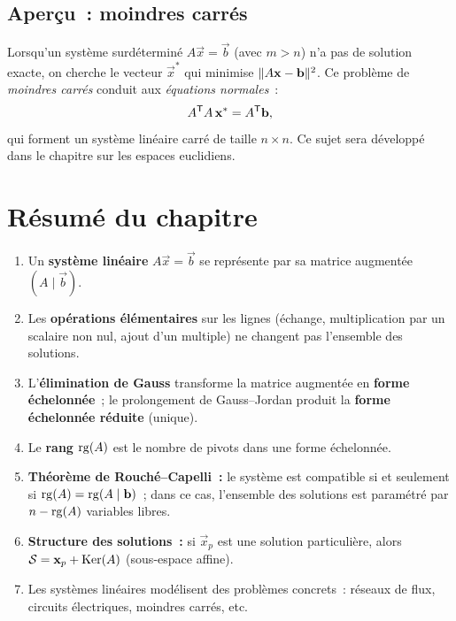 \subsection{Aperçu~: moindres carrés}\label{subsec:moindres-carres}

Lorsqu'un système surdéterminé $A\vec{x}=\vec{b}$ (avec $m>n$) n'a pas de
solution exacte, on cherche le vecteur $\vec{x}^{*}$ qui minimise
$\lVert A\mathbf{x}-\mathbf{b}\rVert^2$. Ce problème de \emph{moindres carrés}%
 conduit aux \emph{équations normales}~:
\begin{equation}\label{eq:equations-normales}
  {A}^{\mathsf{T}}A\,\mathbf{x}^{*}={A}^{\mathsf{T}}\mathbf{b},
\end{equation}
qui forment un système linéaire carré de taille $n\times n$. Ce sujet sera
développé dans le chapitre sur les espaces euclidiens.

\section*{Résumé du chapitre}

\begin{enumerate}[label=\textbf{\arabic*.}]
  \item Un \textbf{système linéaire} $A\vec{x}=\vec{b}$
    se représente par sa matrice augmentée $(A\mid\vec{b})$.
  \item Les \textbf{opérations élémentaires} sur les lignes (échange,
    multiplication par un scalaire non nul, ajout d'un multiple) ne
    changent pas l'ensemble des solutions.
  \item L'\textbf{élimination de Gauss} transforme la matrice augmentée en
    \textbf{forme échelonnée}~; le prolongement de Gauss--Jordan produit la
    \textbf{forme échelonnée réduite} (unique).
  \item Le \textbf{rang} $\operatorname{rg}(A)$ est le nombre de pivots dans une forme
    échelonnée.
  \item \textbf{Théorème de Rouché--Capelli~:} le système est compatible si
    et seulement si $\operatorname{rg}(A)=\operatorname{rg}(A\mid\mathbf{b})$~; dans ce cas, l'ensemble
    des solutions est paramétré par $n-\operatorname{rg}(A)$ variables libres.
  \item \textbf{Structure des solutions~:} si $\vec{x}_p$ est une solution
    particulière, alors ${\mathcal{S}}=\mathbf{x}_p+\operatorname{Ker}(A)$ (sous-espace affine).
  \item Les systèmes linéaires modélisent des problèmes concrets~: réseaux
    de flux, circuits électriques, moindres carrés, etc.
\end{enumerate}

